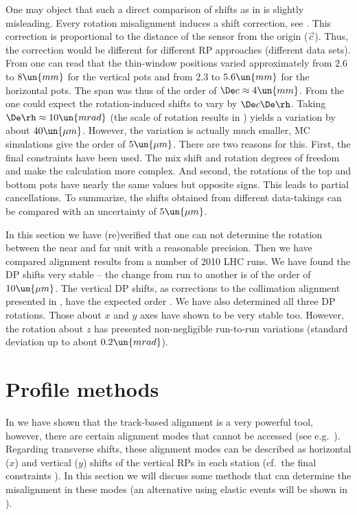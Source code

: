 One may object that such a direct comparison of shifts as in  is slightly misleading. Every rotation misalignment induces a shift correction, see . This correction is proportional to the distance of the sensor from the origin ($\vec c$). Thus, the correction would be different for different RP approaches (different data sets). From  one can read that the thin-window positions varied approximately from $2.6$ to $8\un{mm}$ for the vertical pots and from $2.3$ to $5.6\un{mm}$ for the horizontal pots. The span was thus of the order of $\De c \approx 4\un{mm}$. From the  one could expect the rotation-induced shifts to vary by $\De c \De \rh$. Taking $\De\rh \approx 10 \un{mrad}$ (the scale of rotation results in ) yields a variation by about $40\un{\mu m}$. However, the variation is actually much smaller, MC simulations give the order of $5\un{\mu m}$. There are two reasons for this. First, the final constraints have been used. The mix shift and rotation degrees of freedom and make the calculation more complex. And second, the rotations of the top and bottom pots have nearly the same values but opposite signs. This leads to partial cancellations. To summarize, the shifts obtained from different data-takings can be compared with an uncertainty of $5\un{\mu m}$.


In this section we have (re)verified that one can not determine the rotation between the near and far unit with a reasonable precision. Then we have compared alignment results from a number of 2010 LHC runs. We have found the DP shifts very stable -- the change from run to another is of the order of $10\un{\mu m}$. The vertical DP shifts, as corrections to the collimation alignment presented in , have the expected order . We have also determined all three DP rotations. Those about $x$ and $y$ axes have shown to be very stable too. However, the rotation about $z$ has presented non-negligible run-to-run variations (standard deviation up to about $0.2\un{mrad}$).


\section[al prof]{Profile methods}

In  we have shown that the track-based alignment is a very powerful tool, however, there are certain alignment modes that cannot be accessed (see e.g.~). Regarding transverse shifts, these alignment modes can be described as horizontal ($x$) and vertical ($y$) shifts of the vertical RPs in each station (cf.~the final constraints ). In this section we will discuss some methods that can determine the misalignment in these modes (an alternative using elastic events will be shown in ).

